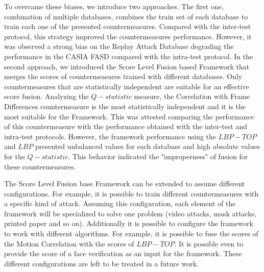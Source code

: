 To overcame these biases, we introduce two approaches. The first one, combination of multiple databases, combines the train set of each database to train each one of the presented countermeasures. Compared with the inter-test protocol, this strategy improved the countermeasures performance. However, it was observed a strong bias on the Replay Attack Database degrading the performance in the CASIA FASD compared with the intra-test protocol. In the second approach, we introduced the Score Level Fusion based Framework that merges the scores of countermeasures trained with different databases. Only countermeasures that are statistically independent are suitable for an effective score fusion. Analyzing the $Q-statistic$ measure, the Correlation with Frame Differences countermeasure is the most statistically independent and it is the most suitable for the Framework. This was attested comparing the performance of this countermeasure with the performance obtained with the inter-test and intra-test protocols.  However, the framework performance using the $LBP-TOP$ and $LBP$ presented unbalanced values for each database and high absolute values for the $Q-statistic$. This behavior indicated the "improperness" of fusion for these countermeasures.

The Score Level Fusion base Framework can be extended to assume different configurations. For example, it is possible to train different countermeasures with a specific kind of attack. Assuming this configuration, each element of the framework will be specialized to solve one problem (video attacks, mask attacks, printed paper and so on).
Additionally it is possible to configure the framework to work with different algorithms. For example, it is possible to fuse the scores of the Motion Correlation with the scores of $LBP-TOP$. It is possible even to provide the score of a face verification as an input for the framework. These different configurations are left to be treated in a future work.


